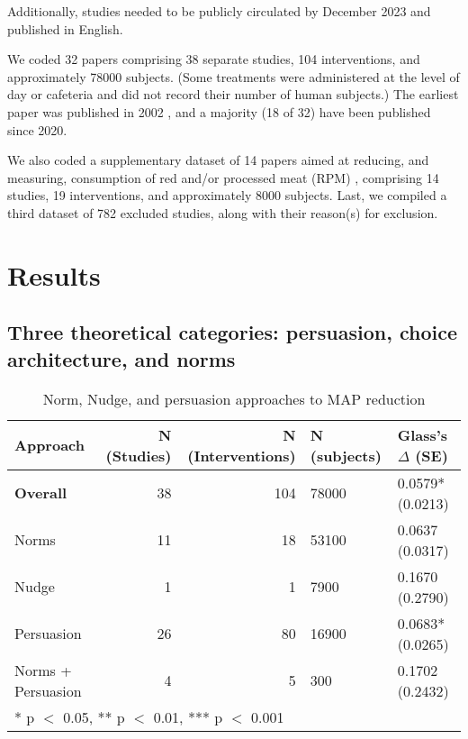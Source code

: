 \documentclass[sn-nature,pdflatex]{sn-jnl}
\begin{document}
Additionally, studies needed to be publicly circulated by December 2023
and published in English.

We coded 32 papers
\citep{abrahamse2007, alblas2023, aldoh2023, allen2002, andersson2021, acharya2004, berndsen2005, bertolaso2015, bianchi2022, bochmann2017, bschaden2020, carfora2023, coker2022, cooney2016, fehrenbach2015, feltz2022, griesoph2021, haile2021, hatami2018, hennessy2016, jalil2023, lacroix2020, mathur2021effectiveness, mattson2020, merrill2009, norris2014, peacock2017, piester2020, polanco2022, sparkman2017, sparkman2020, sparkman2021, weingarten2022}
comprising 38 separate studies, 104 interventions, and approximately
78000 subjects. (Some treatments were administered at the level of day
or cafeteria and did not record their number of human subjects.) The
earliest paper was published in 2002 \citep{allen2002}, and a majority
(18 of 32) have been published since 2020.

We also coded a supplementary dataset of 14 papers aimed at reducing,
and measuring, consumption of red and/or processed meat (RPM)
\citep{carfora2017correlational, carfora2017randomised, carfora2019, carfora2019informational, delichatsios2001, dijkstra2022, emmons2005cancer, emmons2005project, jaacks2014, james2015, lee2018, perino2022, schatzkin2000, sorensen2005},
comprising 14 studies, 19 interventions, and approximately 8000
subjects. Last, we compiled a third dataset of 782 excluded studies,
along with their reason(s) for exclusion.

\section{Results}\label{sec2}

\subsection{Three theoretical categories: persuasion, choice
architecture, and norms}\label{sec2.1}

\begin{table}[!h]
\centering
\caption{\label{tab:tab:table_one}Norm, Nudge, and persuasion approaches to MAP reduction}
\centering
\begin{tabular}[t]{lrrll}
\toprule
Approach & N (Studies) & N (Interventions) & N (subjects) & Glass's $\Delta$ (SE)\\
\midrule
\textbf{Overall} & 38 & 104 & 78000 & 0.0579* (0.0213)\\
Norms & 11 & 18 & 53100 & 0.0637 (0.0317)\\
Nudge & 1 & 1 & 7900 & 0.1670 (0.2790)\\
Persuasion & 26 & 80 & 16900 & 0.0683* (0.0265)\\
Norms + Persuasion & 4 & 5 & 300 & 0.1702 (0.2432)\\
\bottomrule
\multicolumn{5}{l}{\rule{0pt}{1em}* p $<$ 0.05, ** p $<$ 0.01, *** p $<$ 0.001}\\
\end{tabular}
\end{table}
\end{document}
